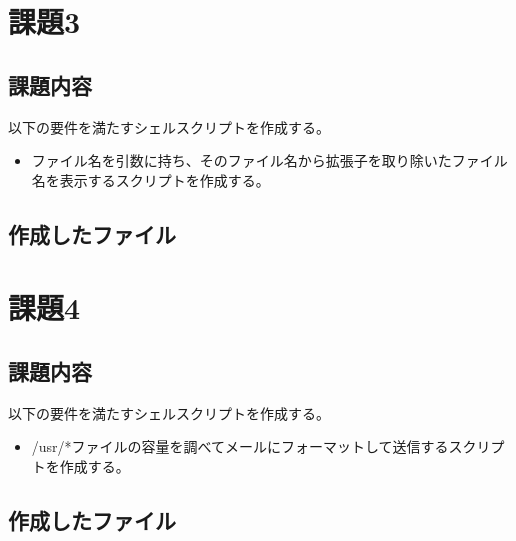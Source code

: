 \documentclass[a4paper,11pt]{jsarticle}
\begin{document}
\section{課題3}
\subsection{課題内容}
以下の要件を満たすシェルスクリプトを作成する。
\begin{itemize}
  \item ファイル名を引数に持ち、そのファイル名から拡張子を取り除いたファイル名を表示するスクリプトを作成する。
\end{itemize}
\subsection{作成したファイル}


\section{課題4}
\subsection{課題内容}
以下の要件を満たすシェルスクリプトを作成する。
\begin{itemize}
  \item /usr/*ファイルの容量を調べてメールにフォーマットして送信するスクリプトを作成する。
\end{itemize}
\subsection{作成したファイル}

\end{document}
